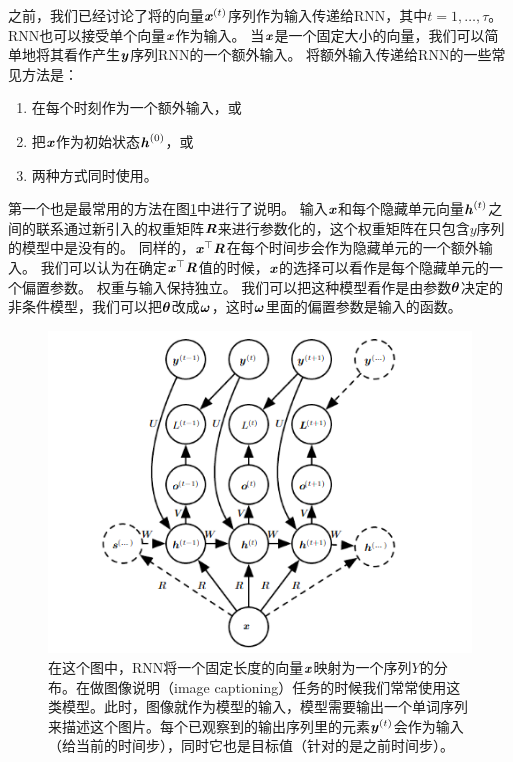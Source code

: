 之前，我们已经讨论了将的向量$\boldsymbol{\mathit{x}}^{(t)}$序列作为输入传递给RNN，其中$t =1, \dots, \tau$。RNN也可以接受单个向量$\boldsymbol{\mathit{x}}$作为输入。
当$\boldsymbol{\mathit{x}}$是一个固定大小的向量，我们可以简单地将其看作产生$\boldsymbol{\mathit{y}}$序列RNN的一个额外输入。
将额外输入传递给RNN的一些常见方法是：
\begin{enumerate}
 \item 在每个时刻作为一个额外输入，或
 \item 把$\boldsymbol{\mathit{x}}$作为初始状态$\boldsymbol{\mathit{h}}^{(0)}$，或
 \item 两种方式同时使用。
\end{enumerate}

第一个也是最常用的方法在图\ref{fig:10_9}中进行了说明。
输入$\boldsymbol{\mathit{x}}$和每个隐藏单元向量$\boldsymbol{\mathit{h}}^{(t)}$之间的联系通过新引入的权重矩阵$\boldsymbol{\mathit{R}}$来进行参数化的，这个权重矩阵在只包含$y$序列的模型中是没有的。
同样的，$\boldsymbol{\mathit{x}}^\top\boldsymbol{\mathit{R}}$在每个时间步会作为隐藏单元的一个额外输入。
我们可以认为在确定$\boldsymbol{\mathit{x}}^\top\boldsymbol{\mathit{R}}$值的时候，$\boldsymbol{\mathit{x}}$的选择可以看作是每个隐藏单元的一个偏置参数。
权重与输入保持独立。
我们可以把这种模型看作是由参数$\boldsymbol{\theta}$决定的非条件模型，我们可以把$\boldsymbol{\theta}$改成$\boldsymbol{\omega}$，这时$\boldsymbol{\omega}$里面的偏置参数是输入的函数。
\begin{figure}[htbp] %
   \centering
   \includegraphics[width=6in]{fig/chap10/10_9.PNG} 
   \caption{ 在这个图中，RNN将一个固定长度的向量$\boldsymbol{\mathit{x}}$映射为一个序列$Y$的分布。在做图像说明（image captioning）任务的时候我们常常使用这类模型。此时，图像就作为模型的输入，模型需要输出一个单词序列来描述这个图片。每个已观察到的输出序列里的元素$\boldsymbol{\mathit{y}}^{(t)}$会作为输入（给当前的时间步），同时它也是目标值（针对的是之前时间步）。}
   \label{fig:10_9}
\end{figure}

